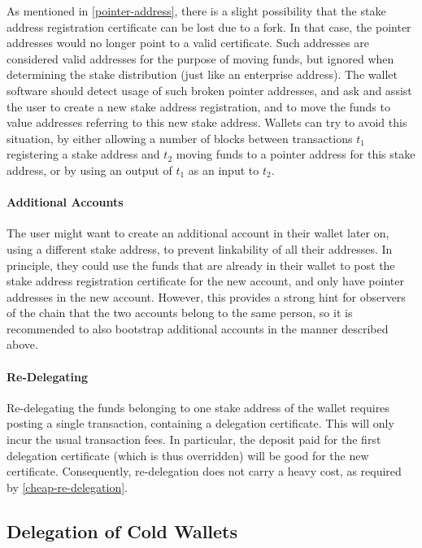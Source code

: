 \documentclass[11pt,a4paper,dvipsnames,twosided]{article}
\begin{document}
As mentioned in \cref{pointer-address}, there is a slight possibility that the
stake address registration certificate can be lost due to a fork. In that case,
the pointer addresses would no longer point to a valid certificate. Such
addresses are considered valid addresses for the purpose of moving funds, but
ignored when determining the stake distribution (just like an enterprise
address). The wallet software should detect usage of such broken pointer
addresses, and ask and assist the user to create a new stake address
registration, and to move the funds to value addresses referring to this new
stake address. Wallets can try to avoid this situation, by either allowing a
number of blocks between transactions \(t_1\) registering a stake address and
\(t_2\) moving funds to a pointer address for this stake address, or by using an
output of \(t_1\) as an input to \(t_2\).

\paragraph{Additional Accounts}
The user might want to create an additional account in their wallet
later on, using a different stake address, to prevent linkability of all
their addresses. In principle, they could use the funds that are
already in their wallet to post the stake address registration certificate
for the new account, and only have pointer addresses in the new
account. However, this provides a strong hint for observers of the
chain that the two accounts belong to the same person, so it is
recommended to also bootstrap additional accounts in the manner
described above.

\paragraph{Re-Delegating}
Re-delegating the funds belonging to one stake address of the wallet
requires posting a single transaction, containing a delegation
certificate. This will only incur the usual transaction fees. In
particular, the deposit paid for the first delegation certificate
(which is thus overridden) will be good for the new
certificate. Consequently, re-delegation does not carry a heavy cost,
as required by \cref{cheap-re-delegation}.

\subsection{Delegation of Cold Wallets}
\label{delegation-of-cold-wallets}
\end{document}
